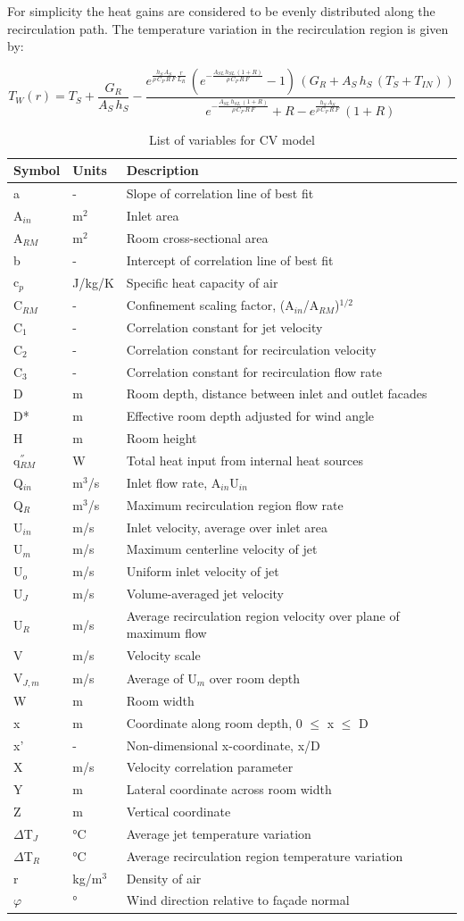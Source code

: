 For simplicity the heat gains are considered to be evenly distributed along the recirculation path. The temperature variation in the recirculation region is given by:

\begin{equation}
{T_W}(r) = {T_S} + \frac{{{G_R}}}{{{A_S}\,{h_S}}} - \frac{{{e^{\frac{{{h_S}\,{A_S}}}{{\rho \,{C_P}\,R\,F}}\frac{r}{{{L_R}}}}}\,({e^{ - \frac{{{A_{SL}}\,{h_{SL}}\,(1 + R)}}{{\rho \,{C_P}\,R\,F}}}} - 1)\,({G_R} + {A_S}\,{h_S}\,({T_S} + {T_{IN}}))}}{{{e^{ - \frac{{{A_{SL}}\,{h_{SL}}\,(1 + R)}}{{\rho \,{C_P}\,R\,F}}}} + R - {e^{\frac{{{h_S}\,{A_S}}}{{\rho \,{C_P}\,R\,F}}}}\,(1 + R)}}
\end{equation}

\begin{longtable}[c]{p{1.0in}p{1.0in}p{3.5in}}
\caption{List of variables for CV model \protect \label{table:list-of-variables-for-cv-model}}\\
\toprule 
Symbol & Units & Description \tabularnewline \midrule
\endhead
a & - & Slope of correlation line of best fit \tabularnewline
A\(_{in}\) & m\(^2\) & Inlet area \tabularnewline
A\(_{RM}\) & m\(^2\) & Room cross-sectional area \tabularnewline
b & - & Intercept of correlation line of best fit \tabularnewline
c\(_{p}\) & J/kg/K & Specific heat capacity of air \tabularnewline
C\(_{RM}\) & - & Confinement scaling factor, (A\(_{in}\)/A\(_{RM}\))\(^{1/2}\) \tabularnewline
C\(_{1}\) & - & Correlation constant for jet velocity \tabularnewline
C\(_{2}\) & - & Correlation constant for recirculation velocity \tabularnewline
C\(_{3}\) & - & Correlation constant for recirculation flow rate \tabularnewline
D & m & Room depth, distance between inlet and outlet facades \tabularnewline
D* & m & Effective room depth adjusted for wind angle \tabularnewline
H & m & Room height \tabularnewline
q\(^{''}_{RM}\) & W & Total heat input from internal heat sources \tabularnewline
Q\(_{in}\) & m\(^3\)/s & Inlet flow rate, A\(_{in}\)U\(_{in}\) \tabularnewline
Q\(_R\) & m\(^3\)/s & Maximum recirculation region flow rate \tabularnewline
U\(_{in}\) & m/s & Inlet velocity, average over inlet area \tabularnewline
U\(_{m}\) & m/s & Maximum centerline velocity of jet \tabularnewline
U\(_{o}\) & m/s & Uniform inlet velocity of jet \tabularnewline
U\(_{J}\) & m/s & Volume-averaged jet velocity \tabularnewline
U\(_{R}\) & m/s & Average recirculation region velocity over plane of maximum flow \tabularnewline
V & m/s & Velocity scale \tabularnewline
V\(_{J,m}\) & m/s & Average of U\(_{m}\) over room depth \tabularnewline
W & m & Room width \tabularnewline
x & m & Coordinate along room depth, 0 $\leq$ x $\leq$ D \tabularnewline
x' & - & Non-dimensional x-coordinate, x/D \tabularnewline
X & m/s & Velocity correlation parameter \tabularnewline
Y & m & Lateral coordinate across room width \tabularnewline
Z & m & Vertical coordinate \tabularnewline
$\Delta$T\(_{J}\) & °C & Average jet temperature variation \tabularnewline
$\Delta$T\(_{R}\) & °C & Average recirculation region temperature variation \tabularnewline
r & kg/m\(^3\) & Density of air \tabularnewline
$\varphi$ & ° & Wind direction relative to façade normal \tabularnewline
\bottomrule
\end{longtable}

